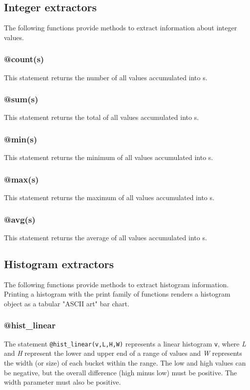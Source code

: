 \documentclass[twoside,english]{article}
\begin{document}
\subsection{Integer extractors}

The following functions provide methods to extract information about integer
values.


\subsubsection{@count(s)}
This statement returns the number of all values accumulated into s.


\subsubsection{@sum(s)}
This statement returns the total of all values accumulated into s.


\subsubsection{@min(s)}
This statement returns the minimum of all values accumulated into s.


\subsubsection{@max(s)}
This statement returns the maximum of all values accumulated into s.


\subsubsection{@avg(s)}
This statement returns the average of all values accumulated into s.


\subsection{Histogram extractors}
The following functions provide methods to extract histogram information.
Printing a histogram with the print family of functions renders a histogram
object as a tabular "ASCII art" bar chart.

\subsubsection{@hist\_linear}
The statement \texttt{@hist\_linear(v,L,H,W)} represents a linear histogram
\texttt{v}, where \emph{L} and \emph{H} represent the lower and upper end of
a range of values and \emph{W} represents the width (or size) of each bucket
within the range.  The low and high values can be negative, but the overall
difference (high minus low) must be positive. The width parameter must also
be positive.
\end{document}
